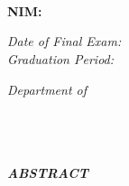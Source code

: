 %
%
%
%

\chapter*{\MakeUppercase{\textit{\judulInggris}}}

\fontsize{14}{16.8}
\begin{center}
	\vspace{0.3cm}
	\MakeUppercase{\textbf{\penulis}}\\
	\MakeUppercase{\textbf{NIM: \nim}}\\
	\fontsize{12}{14.4}
	\vspace{0.7cm}

	\textit{Date of Final Exam: \tanggalSidangInggris}\\
	\textit{Graduation Period:}\ \ \ \ \ \ \ \ \ \ \ \ \ \ \ \ \ \ \ \ \ \ \ \ \ \ \ \ \ \ \ \ \ \ \ \ \ \ 

	\vspace{0.7cm}
	\emph{Department of \programStudiInggris}\\
	\textit{\fakultasInggris}\\
	\universitasInggris\\
	\alamatUniversitasInggris\\

	\vspace{0.7cm}
\end{center}

\fontsize{12}{14.4}
\begin{center}\MakeUppercase{\textbf{\emph{Abstract}}}\end{center}

\noindent
\fontsize{10pt}{12pt}\selectfont
\emph{}\\
 \\